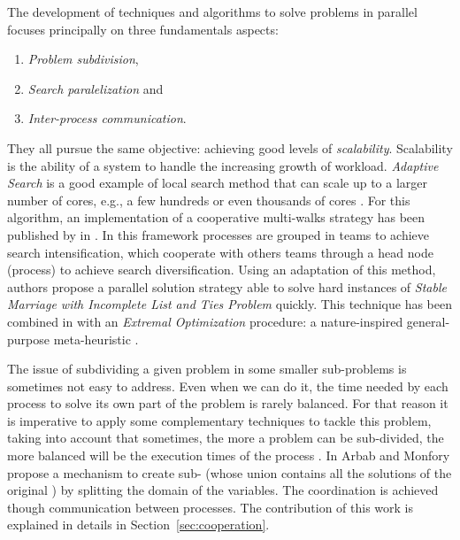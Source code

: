 The development of techniques and algorithms to solve problems in parallel focuses principally on three fundamentals aspects: 
\begin{enumerate}%
    \item {\it Problem subdivision},
    \item {\it Search paralelization} and %
    \item {\it Inter-process communication}.
\end{enumerate}%
They all pursue the same objective: achieving good levels of \textit{scalability}. Scalability is the ability of a system to handle the increasing growth of workload. 
\textit{Adaptive Search} is a good example of local search method that can scale up to a larger number of cores, e.g., a few hundreds or even thousands of cores \cite{Diaz}. For this algorithm, an implementation of a cooperative multi-walks strategy has been published by  in \cite{Munera}. In this framework processes are grouped in teams to achieve search intensification, which cooperate with others teams through a head node (process) to achieve search diversification. Using an adaptation of this method, authors propose a parallel solution strategy able to solve hard instances of \textit{Stable Marriage with Incomplete List and Ties Problem} quickly. This technique has been combined in \cite{Munera2016} with an \textit{Extremal Optimization} procedure: a nature-inspired general-purpose meta-heuristic \cite{Boettcher2000}.
	
The issue of subdividing a given problem in some smaller sub-problems is sometimes not easy to address. Even when we can do it, the time needed by each process to solve its own part of the problem is rarely balanced. For that reason it is imperative to apply some complementary techniques to tackle this problem, taking into account that sometimes, the more a problem can be sub-divided, the more balanced will be the execution times of the process \cite{Rezgui2013, Hill}. In \cite{Arbab2000} Arbab and Monfory propose a mechanism to create sub-\csps{} (whose union contains all the solutions of the original \csp) by splitting the domain of the variables. The coordination is achieved though communication between processes. The contribution of this work is explained in details in Section~\ref{sec:cooperation}. 


